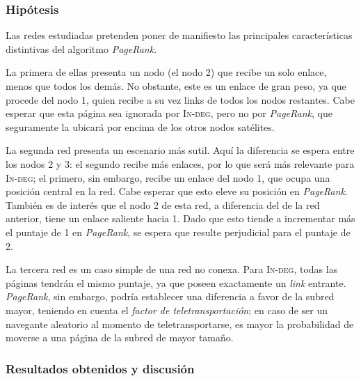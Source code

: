             \subsubsection*{Hipótesis}

            Las redes estudiadas pretenden poner de manifiesto las principales características distintivas del algoritmo \emph{PageRank}.

            La primera de ellas presenta un nodo (el nodo 2) que recibe un solo enlace, menos que todos los demás. No obstante, este es un enlace de gran peso, ya que procede del nodo 1, quien recibe a su vez links de todos los nodos restantes. Cabe esperar que esta página sea ignorada por \textsc{In-deg}, pero no por \emph{PageRank}, que seguramente la ubicará por encima de los otros nodos satélites.

            La segunda red presenta un escenario más sutil. Aquí la diferencia se espera entre los nodos 2 y 3: el segundo recibe más enlaces, por lo que será más relevante para \textsc{In-deg}; el primero, sin embargo, recibe un enlace del nodo 1, que ocupa una posición central en la red. Cabe esperar que esto eleve su posición en \emph{PageRank}. También es de interés que el nodo 2 de esta red, a diferencia del de la red anterior, tiene un enlace saliente hacia 1. Dado que esto tiende a incrementar más el puntaje de 1 en \emph{PageRank}, se espera que resulte perjudicial para el puntaje de 2.

            La tercera red es un caso simple de una red no conexa. Para \textsc{In-deg}, todas las páginas tendrán el mismo puntaje, ya que poseen exactamente un \emph{link} entrante. \emph{PageRank}, sin embargo, podría establecer una diferencia a favor de la subred mayor, teniendo en cuenta el \emph{factor de teletransportación}; en caso de ser un navegante aleatorio al momento de teletransportarse, es mayor la probabilidad de moverse a una página de la subred de mayor tamaño.

            \subsubsection*{Resultados obtenidos y discusión}

